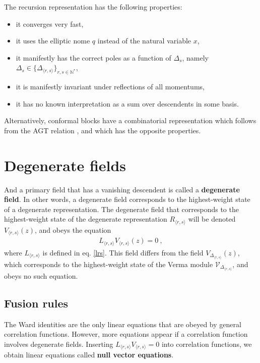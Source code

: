 \documentclass[12pt, a4paper, notitlepage, twoside]{report}
\numberwithin{equation}{section}
\theoremstyle{break}
\begin{document}
The recursion representation has the following properties:
\begin{itemize}
 \item it converges very fast,
\item it uses the elliptic nome $q$ instead of the natural variable $x$,
\item it manifestly has the correct poles as a function of $\Delta_s$, namely $\Delta_s \in \{\Delta_{\langle r,s\rangle}\}_{r,s\in {\mathbb{N}}^*}$,
\item it is manifestly invariant under reflections of all momentums,
\item it has no known interpretation as a sum over descendents in some basis.
\end{itemize}
Alternatively, conformal blocks have a combinatorial representation which follows from the AGT relation \cite{aflt10}, and which has the opposite properties. 


\section{Degenerate fields}\label{sec:degf}

And a primary field that has a vanishing descendent is called a \textbf{\boldmath degenerate field}.
In other words, a degenerate field corresponds to the highest-weight state of a degenerate representation.
The degenerate field that corresponds to the highest-weight state of the degenerate representation $R_{\langle r,s \rangle}$ will be denoted $V_{\langle r,s\rangle}(z)$, and obeys the equation 
\begin{align}
 L_{\langle r,s \rangle} V_{\langle r,s \rangle}(z) = 0 \ , 
\label{lrsv}
\end{align}
where $L_{\langle r,s \rangle}$ is defined in eq. \eqref{lrs}.
This field differs from the field $V_{\Delta_{\langle r,s \rangle}}(z)$, which corresponds to the highest-weight state of the Verma module $\mathcal{V}_{\Delta_{\langle r,s \rangle}}$, and obeys no such equation.


\subsection{Fusion rules}\label{secfr}

The Ward identities are the only linear equations that are obeyed by general correlation functions.
However, more equations appear if a correlation function involves degenerate fields.
Inserting $L_{\langle r,s \rangle} V_{\langle r,s \rangle} = 0$ into correlation functions, we obtain linear equations called \textbf{\boldmath null vector equations}. 
\end{document}
